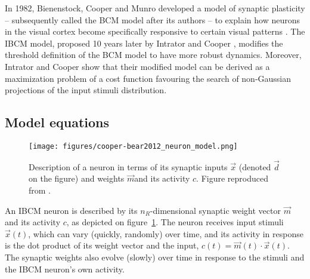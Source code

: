 

In 1982, Bienenstock, Cooper and Munro developed a model of synaptic plasticity -- subsequently called the BCM model after its authors -- to explain how neurons in the visual cortex become specifically responsive to certain visual patterns \cite{bienenstock_theory_1982}. The IBCM model, proposed 10 years later by Intrator and Cooper \cite{intrator_objective_1992}, modifies the threshold definition of the BCM model to have more robust dynamics. Moreover, Intrator and Cooper show that their modified model can be derived as a maximization problem of a cost function favouring the search of non-Gaussian projections of the input stimuli distribution. 

\subsection{Model equations}
\label{subsect:ibcm_equations}

\begin{figure}
	\centering
	\texttt{[image: figures/cooper-bear2012\_neuron\_model.png]}
	\caption{Description of a neuron in terms of its synaptic inputs $\vec{x}$ (denoted $\vec{d}$ on the figure) and weights $\vec{m}$and its activity $c$. Figure reproduced from \cite{cooper_bcm_2012}. }
	\label{fig:ibcm_neuron}
\end{figure}

An IBCM neuron is described by its $n_R$-dimensional synaptic weight vector $\vec{m}$ and its activity $c$, as depicted on figure~\ref{fig:ibcm_neuron}. The neuron receives input stimuli $\vec{x}(t)$, which can vary (quickly, randomly) over time, and its activity in response is the dot product of its weight vector and the input, $c(t) = \vec{m}(t) \cdot \vec{x}(t)$. The synaptic weights also evolve (slowly) over time in response to the stimuli and the IBCM neuron's own activity. 

